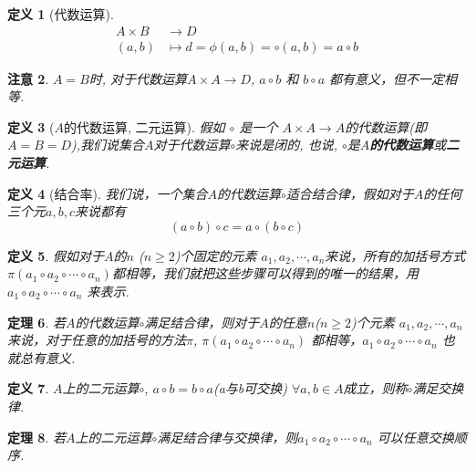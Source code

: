 \documentclass[UTF8]{ctexart}
\newtheorem{Definition}{\hspace{2em}定义}%
\newtheorem{Theorem}[Definition]{\hspace{2em}定理}
\newtheorem{Remark}[Definition]{\hspace{2em}注意}
\begin{document}
\begin{Definition}[代数运算] 
$$\begin{aligned}
A \times B &\rightarrow D \\ 
(a, b) &\mapsto d = \phi(a, b) = \circ (a, b) = a \circ b \end{aligned}$$
\end{Definition}

\begin{Remark}
 $A = B$时, 对于代数运算$ A \times A \rightarrow D $, $ a \circ b $ 和 $ b \circ a $ 都有意义，但不一定相等.
\end{Remark}

\begin{Definition}[$A$的代数运算, 二元运算] 
假如 $ \circ $ 是一个 $ A \times A \rightarrow A$的代数运算(即$A = B = D$),我们说集合$A$对于代数运算$\circ$来说是闭的, 也说, $\circ$是\textbf{$A$的代数运算}或\textbf{二元运算}.
\end{Definition}

\begin{Definition}[结合率]
我们说，一个集合$A$的代数运算$\circ$适合结合律，假如对于$A$的任何三个元$a, b, c$来说都有$$
(a \circ b) \circ c = a \circ (b \circ c)
$$
\end{Definition}

\begin{Definition}
假如对于$A$的$n$ ($n \ge 2$)个固定的元素 $a_1, a_2, \cdots, a_n$来说，所有的加括号方式 $\pi(a_1 \circ a_2 \circ \cdots \circ a_n)$都相等，我们就把这些步骤可以得到的唯一的结果，用$a_1 \circ a_2 \circ \cdots \circ a_n $ 来表示.
\end{Definition}

\begin{Theorem}
若$A$的代数运算$\circ$满足结合律，则对于$A$的任意$n$($n \ge 2$)个元素 $a_1, a_2, \cdots, a_n$来说，对于任意的加括号的方法$\pi$, $\pi(a_1 \circ a_2 \circ \cdots \circ a_n)$ 都相等，$a_1 \circ a_2 \circ \cdots \circ a_n$ 也就总有意义.
\end{Theorem}

\begin{Definition}
$A$上的二元运算$\circ$, $a \circ b = b \circ a$(a与b可交换) $\forall a, b \in A$成立，则称$\circ$满足交换律. 
\end{Definition}

\begin{Theorem}
若$A$上的二元运算$\circ$满足结合律与交换律，则$a_1 \circ a_2 \circ \cdots \circ a_n$ 可以任意交换顺序.
\end{Theorem}
\end{document}
